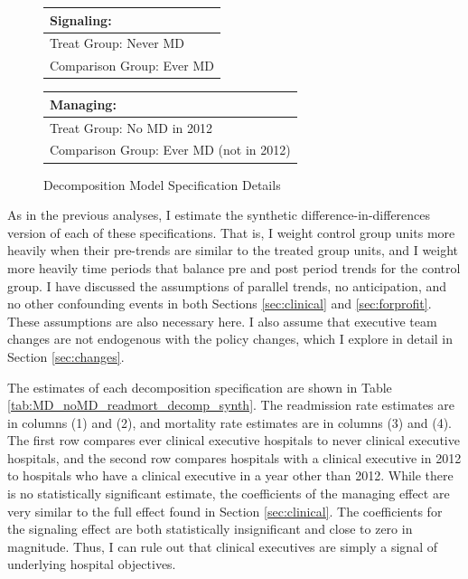\documentclass[12pt]{article}
\begin{document}
\begin{figure}[ht!]
\begin{center}
\caption{\label{fig:decomp_spec}Decomposition Model Specification Details}
 
 \begin{tabular}{| m{18em} |}
 \hline
 Signaling:\\ [0.5ex]
 \hline\hline 
 \vspace{2mm}
 Treat Group:  \hspace{15mm} Never MD \\
 \vspace{2mm}
 Comparison Group: \hspace{3mm} Ever MD  \\
 [1ex]
 \hline
 \end{tabular}
\hfil   %
 \begin{tabular}{|m{18em}|}
 \hline
 Managing:\\ [0.5ex]
 \hline\hline
 \vspace{2mm}
 Treat Group: \hspace{11mm} No MD in 2012 \\
 \vspace{2mm}
 Comparison Group:  Ever MD (not in 2012)  \\
 [1ex]
 \hline
 \end{tabular}
 
\end{center}
 \end{figure}

    As in the previous analyses, I estimate the synthetic difference-in-differences version of each of these specifications. That is, I weight control group units more heavily when their pre-trends are similar to the treated group units, and I weight more heavily time periods that balance pre and post period trends for the control group. I have discussed the assumptions of parallel trends, no anticipation, and no other confounding events in both Sections \ref{sec:clinical} and \ref{sec:forprofit}. These assumptions are also necessary here. I also assume that executive team changes are not endogenous with the policy changes, which I explore in detail in Section \ref{sec:changes}. 


    The estimates of each decomposition specification are shown in Table \ref{tab:MD_noMD_readmort_decomp_synth}. The readmission rate estimates are in columns (1) and (2), and mortality rate estimates are in columns (3) and (4). The first row compares ever clinical executive hospitals to never clinical executive hospitals, and the second row compares hospitals with a clinical executive in 2012 to hospitals who have a clinical executive in a year other than 2012. While there is no statistically significant estimate, the coefficients of the managing effect are very similar to the full effect found in Section \ref{sec:clinical}. The coefficients for the signaling effect are both statistically insignificant and close to zero in magnitude. Thus, I can rule out that clinical executives are simply a signal of underlying hospital objectives. 
\end{document}
